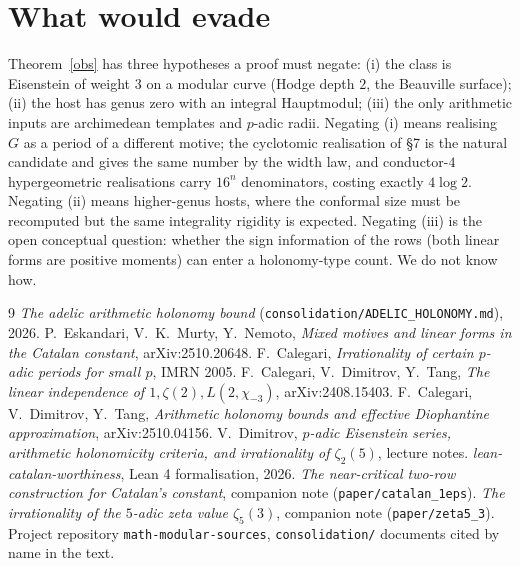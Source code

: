 \documentclass[11pt]{amsart}
\theoremstyle{remark}
\begin{document}
\section{What would evade}
Theorem~\ref{obs} has three hypotheses a proof must negate: (i) the class is Eisenstein of weight $3$ on a modular curve (Hodge depth $2$, the Beauville surface); (ii) the host has genus zero with an integral Hauptmodul; (iii) the only arithmetic inputs are archimedean templates and $p$-adic radii. Negating (i) means realising $G$ as a period of a different motive; the cyclotomic realisation of \S7 is the natural candidate and gives the same number by the width law, and conductor-$4$ hypergeometric realisations carry $16^n$ denominators, costing exactly $4\log2$. Negating (ii) means higher-genus hosts, where the conformal size must be recomputed but the same integrality rigidity is expected. Negating (iii) is the open conceptual question: whether the sign information of the rows (both linear forms are positive moments) can enter a holonomy-type count. We do not know how.

\begin{thebibliography}{9}
 \emph{The adelic arithmetic holonomy bound} (\texttt{consolidation/ADELIC\_HOLONOMY.md}), 2026.
 P.~Eskandari, V.~K.~Murty, Y.~Nemoto, \emph{Mixed motives and linear forms in the Catalan constant}, arXiv:2510.20648.
 F.~Calegari, \emph{Irrationality of certain $p$-adic periods for small $p$}, IMRN 2005.
 F.~Calegari, V.~Dimitrov, Y.~Tang, \emph{The linear independence of $1,\zeta(2),L(2,\chi_{-3})$}, arXiv:2408.15403.
 F.~Calegari, V.~Dimitrov, Y.~Tang, \emph{Arithmetic holonomy bounds and effective Diophantine approximation}, arXiv:2510.04156.
 V.~Dimitrov, \emph{$p$-adic Eisenstein series, arithmetic holonomicity criteria, and irrationality of $\zeta_2(5)$}, lecture notes.
 \emph{lean-catalan-worthiness}, Lean 4 formalisation, 2026.
 \emph{The near-critical two-row construction for Catalan's constant}, companion note (\texttt{paper/catalan\_1eps}).
 \emph{The irrationality of the $5$-adic zeta value $\zeta_5(3)$}, companion note (\texttt{paper/zeta5\_3}).
 Project repository \texttt{math-modular-sources}, \texttt{consolidation/} documents cited by name in the text.
\end{thebibliography}
\end{document}
